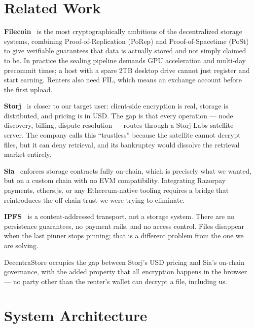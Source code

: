 \documentclass[journal]{IEEEtran}
\begin{document}
\section{Related Work}
\label{sec:related}

\textbf{Filecoin}~\cite{filecoin2020} is the most cryptographically
ambitious of the decentralized storage systems, combining
Proof-of-Replication (PoRep) and Proof-of-Spacetime (PoSt) to give
verifiable guarantees that data is actually stored and not simply claimed
to be. In practice the sealing pipeline demands GPU acceleration and
multi-day precommit times; a host with a spare 2TB desktop drive cannot
just register and start earning. Renters also need FIL, which means an
exchange account before the first upload.

\textbf{Storj}~\cite{storj2018} is closer to our target user:
client-side encryption is real, storage is distributed, and pricing is
in USD. The gap is that every operation — node discovery, billing,
dispute resolution — routes through a Storj Labs satellite server.
The company calls this ``trustless'' because the satellite cannot decrypt
files, but it can deny retrieval, and its bankruptcy would dissolve the
retrieval market entirely.

\textbf{Sia}~\cite{sia2015} enforces storage contracts fully on-chain,
which is precisely what we wanted, but on a custom chain with no EVM
compatibility. Integrating Razorpay payments, ethers.js, or any
Ethereum-native tooling requires a bridge that reintroduces the
off-chain trust we were trying to eliminate.

\textbf{IPFS}~\cite{ipfs2014} is a content-addressed transport, not a
storage system. There are no persistence guarantees, no payment rails,
and no access control. Files disappear when the last pinner stops
pinning; that is a different problem from the one we are solving.

DecentraStore occupies the gap between Storj's USD pricing and
Sia's on-chain governance, with the added property that all encryption
happens in the browser — no party other than the renter's wallet can
decrypt a file, including us.

\section{System Architecture}
\label{sec:arch}
\end{document}
